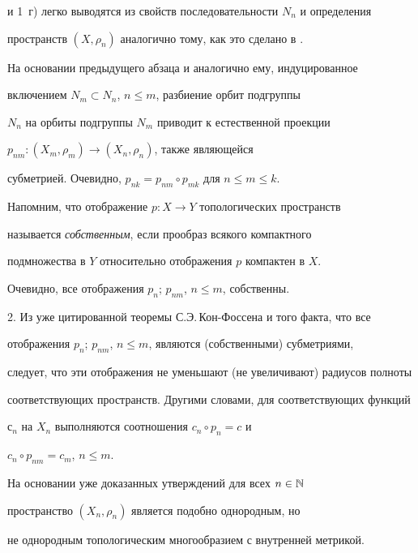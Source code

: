 \begin{pf}
и 1~г) легко выводятся из свойств последовательности $N_{n}$ и определения


пространств $(X,\rho_{n})$ аналогично тому, как это сделано в \cite{B3}.





На основании предыдущего абзаца и аналогично ему, индуцированное


включением $N_{m} \subset N_{n}$, $n \leq m$, разбиение орбит подгруппы


$N_{n}$ на орбиты подгруппы $N_{m}$ приводит к естественной проекции


$p_{nm}: (X_{m},\rho_{m}) \rightarrow (X_{n},\rho_{n})$, также являющейся


субметрией. Очевидно, $p_{nk}=p_{nm}\circ{p_{mk}}$ для $n \leq m \leq k$.





Напомним, что отображение $p:X \rightarrow Y$ топологических пространств


называется {\it собственным}, если прообраз всякого компактного


подмножества в $Y$ относительно отображения $p$ компактен в $X$.


Очевидно, все отображения $p_{n}$; $p_{nm}$, $n \leq m$, собственны.





2. Из уже цитированной теоремы С.Э.\,Кон-Фоссена и того факта, что все


отображения $p_{n}$; $p_{nm}$, $n \leq m$, являются (собственными) субметриями,


следует, что эти отображения не уменьшают (не увеличивают) радиусов полноты


соответствующих пространств. Другими словами, для соответствующих функций


$с_{n}$ на $X_{n}$ выполняются соотношения $c_{n}\circ{p_{n}}=c$ и


$c_{n}\circ{p_{nm}}=c_{m}$, $n \leq m$.





На основании уже доказанных утверждений для всех $n \in \Bbb{N}$


пространство $(X_{n},\rho_{n})$ является подобно однородным, но


не однородным топологическим многообразием с внутренней метрикой.






\end{pf}
